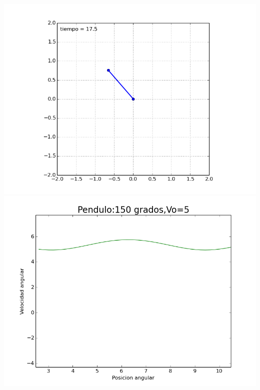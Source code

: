 \documentclass[12pt]{article}
\begin{document}
\begin{center}
\includegraphics[scale=0.5]{150v.png}\\
\includegraphics[scale=0.5]{figure_150v.png}
\end{center}
\end{document}
